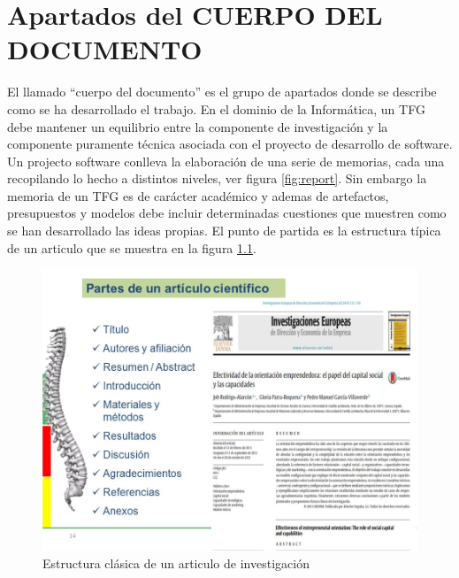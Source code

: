 
 \chapter{Apartados del CUERPO DEL DOCUMENTO}

El llamado ``cuerpo del documento'' es el grupo de apartados donde se describe como  se ha desarrollado el trabajo. En el dominio de la Informática, un TFG debe mantener un equilibrio entre la componente de investigación y la componente puramente técnica asociada con el proyecto de desarrollo de software. Un projecto software conlleva la elaboración de una serie de memorias, cada una recopilando lo hecho a distintos niveles, ver figura \ref{fig:report}. Sin embargo la memoria de un TFG es de carácter académico y ademas de artefactos, presupuestos y modelos debe incluir determinadas cuestiones que muestren como se han desarrollado las ideas propias. El punto de partida es la estructura típica de un articulo que se muestra en la figura \ref{fig:articulo}.


\begin{figure}

	\begin{center}
		\includegraphics[scale = 0.45]{Figuras/articulo.jpg}
	\end{center}
	\caption{Estructura clásica de un articulo de investigación}
	\label{fig:articulo}
\end{figure}


